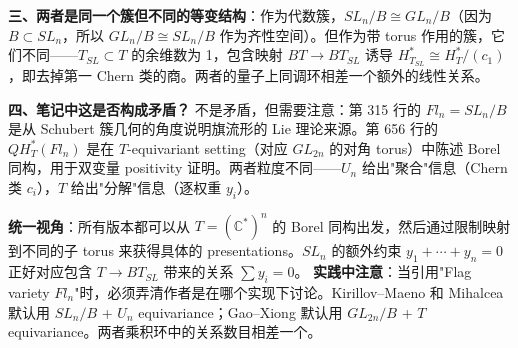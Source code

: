 \textbf{三、两者是同一个簇但不同的等变结构}：作为代数簇，$SL_n/B \cong GL_n/B$（因为 $B \subset SL_n$，所以 $GL_n/B \cong SL_n/B$ 作为齐性空间）。但作为带 torus 作用的簇，它们不同——$T_{SL} \subset T$ 的余维数为 1，包含映射 $BT \to BT_{SL}$ 诱导 $H^*_{T_{SL}} \cong H^*_T / (c_1)$，即去掉第一 Chern 类的商。两者的量子上同调环相差一个额外的线性关系。

\textbf{四、笔记中这是否构成矛盾？} 不是矛盾，但需要注意：第 315 行的 $Fl_n = SL_n/B$ 是从 Schubert 簇几何的角度说明旗流形的 Lie 理论来源。第 656 行的 $QH_T^*(Fl_n)$ 是在 $T$-equivariant setting（对应 $GL_{2n}$ 的对角 torus）中陈述 Borel 同构，用于双变量 positivity 证明。两者粒度不同——$U_n$ 给出"聚合"信息（Chern 类 $c_i$），$T$ 给出"分解"信息（逐权重 $y_i$）。

\begin{insight}
\textbf{统一视角}：所有版本都可以从 $T = (\mathbb{C}^*)^n$ 的 Borel 同构出发，然后通过限制映射到不同的子 torus 来获得具体的 presentations。$SL_n$ 的额外约束 $y_1+\cdots+y_n=0$ 正好对应包含 $T \to BT_{SL}$ 带来的关系 $\sum y_i = 0$。
\textbf{实践中注意}：当引用"Flag variety $Fl_n$"时，必须弄清作者是在哪个实现下讨论。Kirillov--Maeno 和 Mihalcea 默认用 $SL_n/B$ + $U_n$ equivariance；Gao--Xiong 默认用 $GL_{2n}/B$ + $T$ equivariance。两者乘积环中的关系数目相差一个。
\end{insight}
